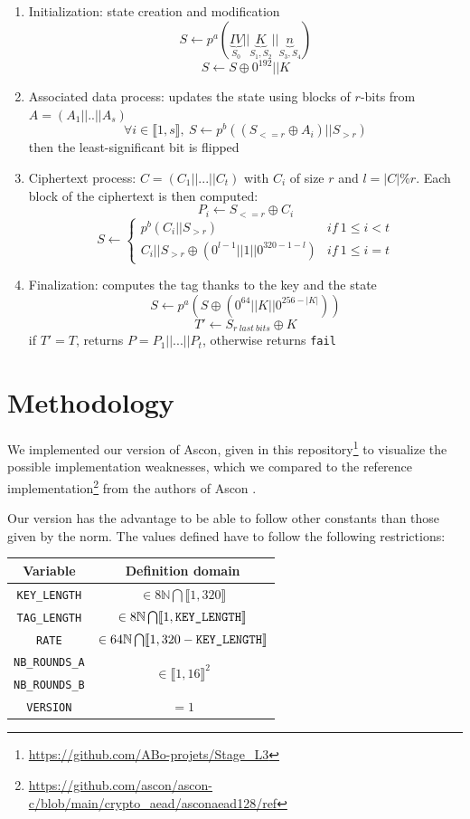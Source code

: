 \documentclass[a4paper,11pt,twocolumn]{article}
\begin{document}
	\begin{enumerate}
		\item Initialization: state creation and modification
		$$S \leftarrow p^{a}( \underbrace{IV}_{S_0}||\underbrace{K}_{S_1,S_2}||\underbrace{n}_{S_3,S_4})$$
		$$S \leftarrow S \oplus 0^{192} || K$$
		\item Associated data process: updates the state using blocks of $r$-bits from $A=(A_1||..||A_s)$
		$$\forall i \in \llbracket 1,s \rrbracket,\  S \leftarrow p^b((S_{<=r} \oplus A_i)||S_{>r})$$
		then the least-significant bit is flipped
		\item Ciphertext process: $C = (C_1 || ... || C_t)$ with $C_i$ of size $r$ and $l=|C| \% r$. Each block of the ciphertext is then computed:
		$$P_i \leftarrow S_{<=r} \oplus C_i$$
		$$S \leftarrow \left \{	\begin{array}{ll}
			p^b(C_i||S_{>r}) & if\ 1 \le i < t \\
			C_i||S_{>r} \oplus  (0^{l-1}||1||0^{320-1-l}) & if\ 1 \le i = t
		\end{array}
		\right.$$
		\item Finalization: computes the tag thanks to the key and the state
		$$S \leftarrow p^a(S \oplus (0^{64} || K || 0^{256-|K|}))$$
		$$T' \leftarrow S_{r\ last\ bits} \oplus K$$
		if $T'= T$, returns $P = P_1 || ... || P_t$, otherwise returns \verb|fail|
	\end{enumerate}
	
	\section{Methodology}
	We implemented our version of Ascon, given in this repository\footnote{\url{https://github.com/ABo-projets/Stage_L3}} to visualize the possible implementation weaknesses, which we compared to the reference implementation\footnote{\url{https://github.com/ascon/ascon-c/blob/main/crypto\_aead/asconaead128/ref}} from the authors of Ascon \cite{ascon}.
	
	Our version has the advantage to be able to follow other constants than those given by the norm. The values defined have to follow the following restrictions:
	
	\begin{center}
		\footnotesize
		\begin{tabular}{|c|c|}
			\hline
			\textbf{Variable} & \textbf{Definition domain}\\
			\hline
			\verb|KEY_LENGTH| & $\in 8\mathbb{N} \bigcap \llbracket 1,320 \rrbracket$\\
			\hline
			\verb|TAG_LENGTH| & $\in 8\mathbb{N} \bigcap \llbracket 1,\verb|KEY_LENGTH| \rrbracket$\\
			\hline
			\verb|RATE| & $\in 64\mathbb{N} \bigcap \llbracket 1,320-\verb|KEY_LENGTH| \rrbracket$\\
			\hline
			\verb|NB_ROUNDS_A| & \multirow{2}{*}{$\in \llbracket 1,16 \rrbracket^2$}\\
			\verb|NB_ROUNDS_B| &\\
			\hline
			\verb|VERSION| & $=1$ \\
			\hline
		\end{tabular}
	\end{center}
	
\end{document}
